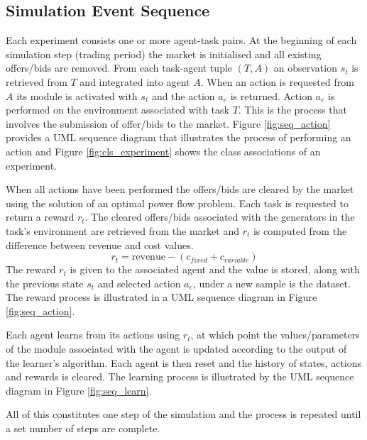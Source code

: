 \subsection{Simulation Event Sequence}
Each experiment consists one or more agent-task pairs. At the beginning of each
simulation step (trading period) the market is initialised and all existing
offers/bids are removed.  From each task-agent tuple $(T,A)$ an observation
$s_t$ is retrieved from $T$ and integrated into agent $A$.  When an action is
requested from $A$ its module is activated with $s_t$ and the action $a_e$ is
returned.  Action $a_e$ is performed on the environment associated with task
$T$.  This is the process that involves the submission of offer/bids to the
market.  Figure \ref{fig:seq_action} provides a UML sequence diagram that
illustrates the process of performing an action and Figure
\ref{fig:cls_experiment} shows the class associations of an experiment.


When all actions have been performed the offers/bids are cleared by the
market using the solution of an optimal power flow problem.  Each task is
requested to return a reward $r_t$.  The cleared offers/bids associated with
the generators in the task's environment are retrieved from the market
and $r_t$ is computed from the difference between revenue and cost values.
\begin{equation}
r_t = \mbox{revenue} - (c_{fixed} + c_{variable})
\end{equation}
The reward $r_t$ is given to the associated agent and the value is stored,
along with the previous state $s_t$ and selected action $a_e$, under a new
sample is the dataset.  The reward process is illustrated in a UML sequence
diagram in Figure \ref{fig:seq_action}.


Each agent learns from its actions using $r_t$, at which point the
values/parameters of the module associated with the agent is updated according
to the output of the learner's algorithm.  Each agent is then reset and the
history of states, actions and rewards is cleared.  The learning process is
illustrated by the UML sequence diagram in  Figure \ref{fig:seq_learn}.

All of this constitutes one step of the simulation and the process is
repeated until a set number of steps are complete.

